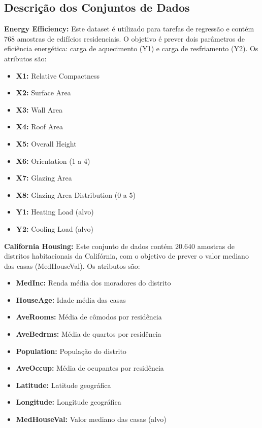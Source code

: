 \subsection{Descrição dos Conjuntos de Dados}

\textbf{Energy Efficiency:} Este dataset é utilizado para tarefas de regressão e contém 768 amostras de edifícios residenciais. O objetivo é prever dois parâmetros de eficiência energética: carga de aquecimento (Y1) e carga de resfriamento (Y2). Os atributos são:
\begin{itemize}
    \item \textbf{X1:} Relative Compactness
    \item \textbf{X2:} Surface Area
    \item \textbf{X3:} Wall Area
    \item \textbf{X4:} Roof Area
    \item \textbf{X5:} Overall Height
    \item \textbf{X6:} Orientation (1 a 4)
    \item \textbf{X7:} Glazing Area
    \item \textbf{X8:} Glazing Area Distribution (0 a 5)
    \item \textbf{Y1:} Heating Load (alvo)
    \item \textbf{Y2:} Cooling Load (alvo)
\end{itemize}

\textbf{California Housing:} Este conjunto de dados contém 20.640 amostras de distritos habitacionais da Califórnia, com o objetivo de prever o valor mediano das casas (MedHouseVal). Os atributos são:
\begin{itemize}
    \item \textbf{MedInc:} Renda média dos moradores do distrito
    \item \textbf{HouseAge:} Idade média das casas
    \item \textbf{AveRooms:} Média de cômodos por residência
    \item \textbf{AveBedrms:} Média de quartos por residência
    \item \textbf{Population:} População do distrito
    \item \textbf{AveOccup:} Média de ocupantes por residência
    \item \textbf{Latitude:} Latitude geográfica
    \item \textbf{Longitude:} Longitude geográfica
    \item \textbf{MedHouseVal:} Valor mediano das casas (alvo)
\end{itemize}

